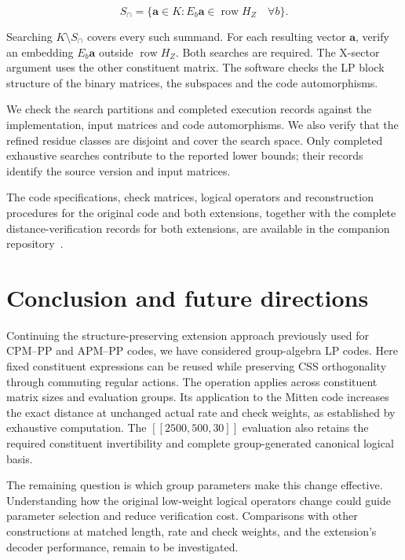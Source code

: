 \documentclass[12pt]{article}
\begin{document}
\begin{equation}
 S_{\cap}=\{\mathbf a\in K:E_b\mathbf a\in\operatorname{row}H_Z
                 \quad\forall b\}.\label{eq:commontrivial}
\end{equation}

Searching $K\setminus S_{\cap}$ covers every such summand. For each
resulting vector $\mathbf a$, verify an embedding $E_b\mathbf a$ outside
$\operatorname{row}H_Z$. Both searches are required. The X-sector argument
uses the other constituent matrix. The software checks the LP block
structure of the binary matrices, the subspaces and the code automorphisms.

We check the search partitions and completed execution records against
the implementation, input matrices and code automorphisms. We also verify
that the refined residue classes are disjoint and cover the search space.
Only completed exhaustive searches contribute to the reported lower bounds;
their records identify the source version and input matrices.

The code specifications, check matrices, logical operators and
reconstruction procedures for the original code and both extensions,
together with the complete distance-verification records for both
extensions, are available in the companion repository~\cite{certificates}.

\section{Conclusion and future directions}
Continuing the structure-preserving extension approach previously used
for CPM--PP and APM--PP codes, we have considered group-algebra LP codes.
Here fixed constituent expressions can be reused while preserving CSS
orthogonality through commuting regular actions. The operation applies across
constituent matrix sizes and evaluation groups. Its application to the
Mitten code increases the exact distance at unchanged actual rate and
check weights, as established by exhaustive computation. The
$[[2500,500,30]]$ evaluation also retains the required constituent
invertibility and complete group-generated canonical logical basis.

The remaining question is which group parameters make this change effective.
Understanding how the original low-weight logical operators change could
guide parameter selection and reduce verification cost. Comparisons with
other constructions at matched length, rate and check weights, and the
extension's decoder performance, remain to be investigated.


\end{document}
